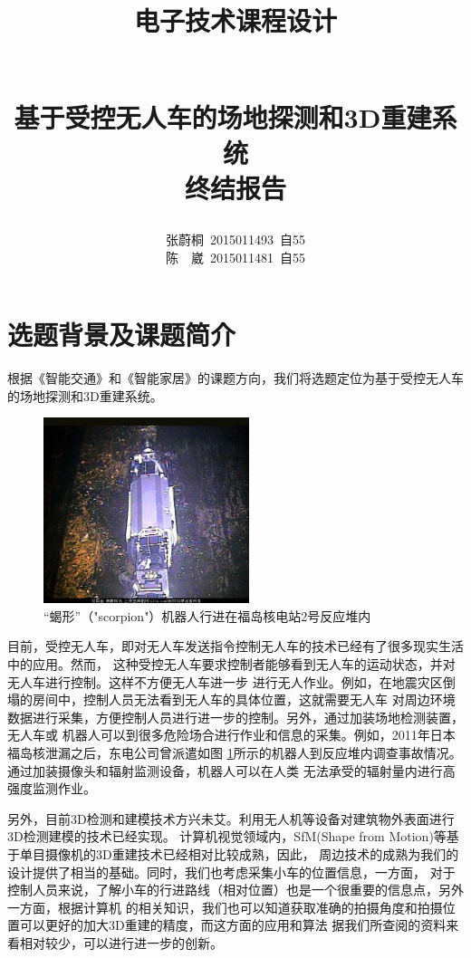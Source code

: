 \documentclass[a4paper]{paper}
\title{
    \begin{large}电子技术课程设计\end{large}\\
    基于受控无人车的场地探测和3D重建系统\\
    终结报告
}
\author{
    张蔚桐\ 2015011493\ 自55\\
    陈　崴\ 2015011481\ 自55
}
\begin{document}
\maketitle
\tableofcontents    
\clearpage
\section{选题背景及课题简介}
根据《智能交通》和《智能家居》的课题方向，我们将选题定位为基于受控无人车的场地探测和3D重建系统。

\begin{figure}
    \centering
    \includegraphics[width = 60mm]{../preview/Robo.jpg}
    \caption{“蝎形”（"scorpion"）机器人行进在福岛核电站2号反应堆内}
    \label{Robo}
\end{figure}
目前，受控无人车，即对无人车发送指令控制无人车的技术已经有了很多现实生活中的应用。然而，
这种受控无人车要求控制者能够看到无人车的运动状态，并对无人车进行控制。这样不方便无人车进一步
进行无人作业。例如，在地震灾区倒塌的房间中，控制人员无法看到无人车的具体位置，这就需要无人车
对周边环境数据进行采集，方便控制人员进行进一步的控制。另外，通过加装场地检测装置，无人车或
机器人可以到很多危险场合进行作业和信息的采集。例如，2011年日本福岛核泄漏之后，东电公司曾派遣如图
\ref{Robo}所示的机器人到反应堆内调查事故情况。通过加装摄像头和辐射监测设备，机器人可以在人类
无法承受的辐射量内进行高强度监测作业。

另外，目前3D检测和建模技术方兴未艾。利用无人机等设备对建筑物外表面进行3D检测建模的技术已经实现。
计算机视觉领域内，SfM(Shape from Motion)等基于单目摄像机的3D重建技术已经相对比较成熟，因此，
周边技术的成熟为我们的设计提供了相当的基础。同时，我们也考虑采集小车的位置信息，一方面，
对于控制人员来说，了解小车的行进路线（相对位置）也是一个很重要的信息点，另外一方面，根据计算机
的相关知识，我们也可以知道获取准确的拍摄角度和拍摄位置可以更好的加大3D重建的精度，而这方面的应用和算法
据我们所查阅的资料来看相对较少，可以进行进一步的创新。
\end{document}
